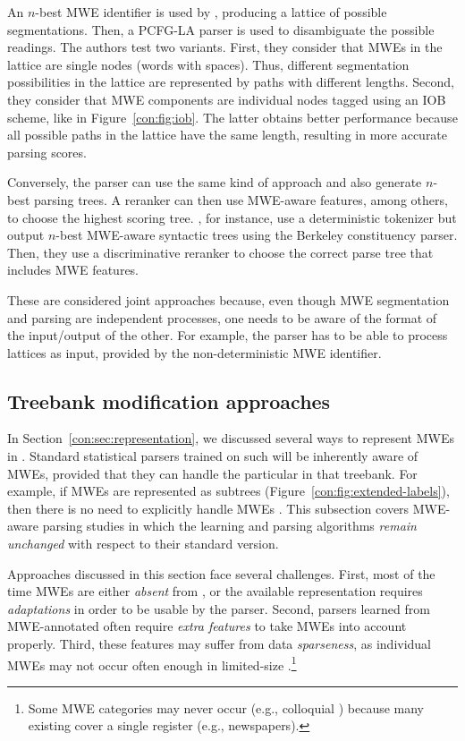 \documentclass[output=paper]{langsci/langscibook}
\begin{document}
An $n$-best MWE identifier is used by \citet{constant13combining}, producing a lattice of possible segmentations. Then, a PCFG-LA parser is used to disambiguate the possible readings. The authors test two variants. First, they consider that MWEs in the lattice are single nodes (words with spaces). 
Thus, different segmentation possibilities in the lattice are represented by paths with different lengths. Second, they consider that MWE components are individual nodes tagged using an IOB scheme, like in Figure~\ref{con:fig:iob}. The latter obtains better performance because all possible paths in the lattice have the same length, resulting in more accurate parsing scores.

Conversely, the parser can use the same kind of approach and also generate $n$-best parsing trees.
A reranker can then use MWE-aware features, among others, to choose the highest scoring tree. \citet{constant12acl}, for instance, use a deterministic tokenizer but output $n$-best MWE-aware syntactic trees using the Berkeley constituency parser. Then, they use a discriminative reranker to choose the correct parse tree that includes MWE features.  

These are considered joint approaches because, even though MWE segmentation and parsing are independent processes, one needs to be aware of the format of the input\slash output of the other.
For example, the parser has to be able to process lattices as input, provided by the non-deterministic MWE identifier.

\subsection{Treebank modification approaches}
\label{con:ssec:joint:data}

In Section~\ref{con:sec:representation}, we discussed several ways to represent MWEs in .
Standard statistical parsers trained on such  will be inherently aware of MWEs, provided that they can handle the particular  in that treebank.
For example, if MWEs are represented as subtrees (Figure~\ref{con:fig:extended-labels}), then there is no need to explicitly handle MWEs \citep{nivre16}.
This subsection covers MWE-aware parsing studies   in which the learning and parsing algorithms \emph{remain unchanged} with respect to their standard version.

Approaches discussed in this section face several challenges.
First, most of the time MWEs are either \textit{absent} from , or the available representation requires \textit{adaptations} in order to be usable by the parser.
Second, parsers learned from MWE-annotated  often require \textit{extra features} to take MWEs into account properly. Third, these features may suffer from data \textit{sparseness}, as individual MWEs may not occur often enough in limited-size .\footnote{
Some MWE categories may never occur (e.g., colloquial ) because many existing  cover a single register (e.g., newspapers).}
\end{document}
